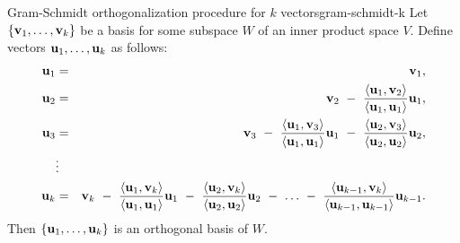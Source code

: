 \begin{proposition}{Gram-Schmidt orthogonalization procedure for $k$ vectors}{gram-schmidt-k}
  Let $\set{\vect{v}_1,\ldots,\vect{v}_k}$ be a basis for some subspace $W$
  of an inner product space $V$.%
  Define vectors
  $\vect{u}_1,\ldots,\vect{u}_k$ as follows:
  \begin{eqnarray*}
    \vect{u}_1
    &=& \vect{v}_1,
    \\
    \vect{u}_2
    &=& \vect{v}_2
        ~-~ \frac{\iprod{\vect{u}_1,\vect{v}_2}}{\iprod{\vect{u}_1,\vect{u}_1}}\vect{u}_1,
    \\
    \vect{u}_3
    &=& \vect{v}_3
        ~-~ \frac{\iprod{\vect{u}_1,\vect{v}_3}}{\iprod{\vect{u}_1,\vect{u}_1}}\vect{u}_1
        ~-~ \frac{\iprod{\vect{u}_2,\vect{v}_3}}{\iprod{\vect{u}_2,\vect{u}_2}}\vect{u}_2,
    \\
    &\vdots&
    \\
    \vect{u}_k
    &=& \vect{v}_k
        ~-~ \frac{\iprod{\vect{u}_1,\vect{v}_k}}{\iprod{\vect{u}_1,\vect{u}_1}}\vect{u}_1
        ~-~ \frac{\iprod{\vect{u}_2,\vect{v}_k}}{\iprod{\vect{u}_2,\vect{u}_2}}\vect{u}_2
        ~-~ \ldots
        ~-~ \frac{\iprod{\vect{u}_{k-1},\vect{v}_k}}{\iprod{\vect{u}_{k-1},\vect{u}_{k-1}}}\vect{u}_{k-1}.
  \end{eqnarray*}
  Then $\set{\vect{u}_1,\ldots,\vect{u}_k}$ is an orthogonal basis of $W$.
\end{proposition}

